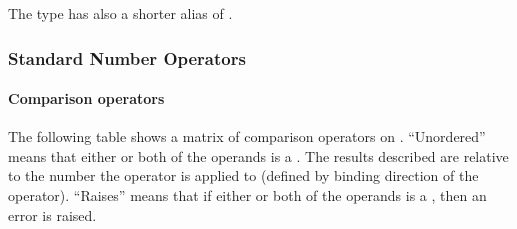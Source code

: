 The  type has also a shorter alias of . 





\subsubsection{Standard Number Operators}

\paragraph{Comparison operators}
The following table shows a matrix of comparison operators on . ``Unordered'' means that either or both of the operands is a . The results described are relative to the number the operator is applied to (defined by binding direction of the operator). ``Raises'' means that if either or both of the operands is a , then an error is raised. 

